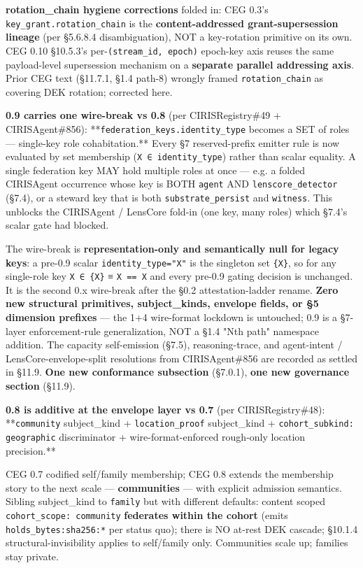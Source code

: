 \documentclass[10pt]{article}
\begin{document}
\textbf{rotation\_chain hygiene corrections} folded in: CEG 0.3's \texttt{key\_grant.rotation\_chain} is the \textbf{content-addressed grant-supersession lineage} (per §5.6.8.4 disambiguation), NOT a key-rotation primitive on its own. CEG 0.10 §10.5.3's per-\texttt{(stream\_id, epoch)} epoch-key axis reuses the same payload-level supersession mechanism on a \textbf{separate parallel addressing axis}. Prior CEG text (§11.7.1, §1.4 path-8) wrongly framed \texttt{rotation\_chain} as covering DEK rotation; corrected here.


\textbf{0.9 carries one wire-break vs 0.8} (per CIRISRegistry\#49 + CIRISAgent\#856): **\texttt{federation\_keys.identity\_type} becomes a SET of roles — single-key role cohabitation.** Every §7 reserved-prefix emitter rule is now evaluated by set membership (\texttt{X ∈ identity\_type}) rather than scalar equality. A single federation key MAY hold multiple roles at once — e.g. a folded CIRISAgent occurrence whose key is BOTH \texttt{agent} AND \texttt{lenscore\_detector} (§7.4), or a steward key that is both \texttt{substrate\_persist} and \texttt{witness}. This unblocks the CIRISAgent / LensCore fold-in (one key, many roles) which §7.4's scalar gate had blocked.


The wire-break is \textbf{representation-only and semantically null for legacy keys}: a pre-0.9 scalar \texttt{identity\_type="X"} is the singleton set \texttt{\{X\}}, so for any single-role key \texttt{X ∈ \{X\}} ≡ \texttt{X == X} and every pre-0.9 gating decision is unchanged. It is the second 0.x wire-break after the §0.2 attestation-ladder rename. \textbf{Zero new structural primitives, subject\_kinds, envelope fields, or §5 dimension prefixes} — the 1+4 wire-format lockdown is untouched; 0.9 is a §7-layer enforcement-rule generalization, NOT a §1.4 "Nth path" namespace addition. The capacity self-emission (§7.5), reasoning-trace, and agent-intent / LensCore-envelope-split resolutions from CIRISAgent\#856 are recorded as settled in §11.9. \textbf{One new conformance subsection} (§7.0.1), \textbf{one new governance section} (§11.9).


\textbf{0.8 is additive at the envelope layer vs 0.7} (per CIRISRegistry\#48): **\texttt{community} subject\_kind + \texttt{location\_proof} subject\_kind + \texttt{cohort\_subkind: geographic} discriminator + wire-format-enforced rough-only location precision.**


CEG 0.7 codified self/family membership; CEG 0.8 extends the membership story to the next scale — \textbf{communities} — with explicit admission semantics. Sibling subject\_kind to \texttt{family} but with different defaults: content scoped \texttt{cohort\_scope: community} \textbf{federates within the cohort} (emits \texttt{holds\_bytes:sha256:*} per status quo); there is NO at-rest DEK cascade; §10.1.4 structural-invisibility applies to self/family only. Communities scale up; families stay private.
\end{document}
